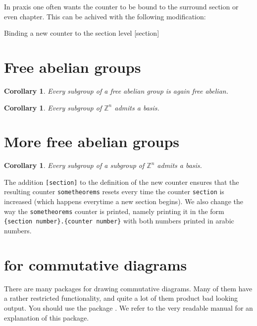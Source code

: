 In praxis one often wants the counter to be bound to the surround section or even chapter.
This can be achived with the following modification:
\begin{showlatex}[
  before lower = {\stoptoc},
  after lower = {\starttoc, \addtocounter{section}{-2}}
]{Binding a new counter to the section level}
[section]
\renewcommand{\thesometheorems}{\thesection.\arabic{sometheorems}}
\newtheorem{corollary}[sometheorems]{Corollary}

\section{Free abelian groups}

\begin{corollary}
  Every subgroup of a free abelian group is again free abelian.
\end{corollary}

\begin{corollary}
  Every subgroup of $\mathbb{Z}^n$ admits a basis.
\end{corollary}

\section{More free abelian groups}

\begin{corollary}
  Every subgroup of a subgroup of $\mathbb{Z}^n$ admits a basis.
\end{corollary}
\end{showlatex}
The addition \texttt{[section]} to the definition of the new counter ensures that the resulting counter \texttt{sometheorems} resets every time the counter \texttt{section} is increased (which happens everytime a new section begins).
We also change the way the \texttt{sometheorems} counter is printed, namely printing it in the form \texttt{\{section number\}.\{counter number\}} with both numbers printed in arabic numbers.





\section{\texorpdfstring{}{tikz-cd} for commutative diagrams}

There are many packages for drawing commutative diagrams.
Many of them have a rather restricted functionality, and quite a lot of them product bad looking output.
You should use the package .
We refer to the very readable manual \cite{tikz-cd} for an explanation of this package.





